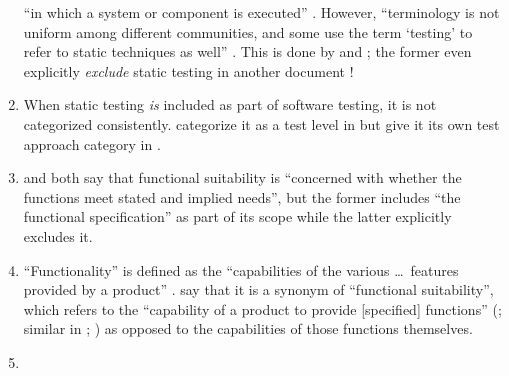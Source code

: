 \begin{enumerate}
          ``in which a system or component is executed'' \citep[p.~427]{IEEE2017}.
          However, ``terminology is not uniform among different communities, and
          some use the term `testing' to refer to static techniques%
           as well'' \citep[p.~5\=/2]{SWEBOK2024}.
          This is done by \citet[pp.~16\==17]{IEEE2022} and
          \citet[pp.~8\==9]{Gerrard2000a}; the former even explicitly
          \emph{exclude} static testing in another
          document \citeyearpar[p.~440]{IEEE2017}!
    \item %
          When static testing \emph{is} included as part of software testing,
          it is not categorized consistently. \citeauthor{IEEE2021b} categorize
          it as a test level in \citeyearpar[p.~43]{IEEE2021b} but give it its
          own test approach category in \citeyearpar[p.~10, 23, Fig.~2]{IEEE2022}.
    \item %
          \citet{ISO_IEC2023a} and \citet[p.~196]{IEEE2017} both say that
          functional suitability is ``concerned with whether the functions meet
          stated and implied needs'', but the former includes ``the functional
          specification'' as part of its scope while the latter explicitly
          excludes it.
    \item %
          ``Functionality'' is defined as the ``capabilities of the various
          \dots\ features provided by a product'' \citep[p.~196]{IEEE2017}.
          \citetISTQB{} say that it is a synonym of ``functional suitability'',
          which refers to the ``capability of a product to provide [specified]
          functions'' (\citealp{ISO_IEC2023a}; similar in
          \citealp[p.~196]{IEEE2017}; \citealpISTQB{}) as opposed to the
          capabilities of those functions themselves.
    \item %

\end{enumerate}
